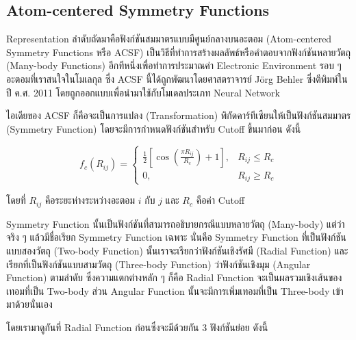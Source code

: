 \subsection{Atom-centered Symmetry Functions}
\label{ssec:acsf}

Representation ลำดับถัดมาคือฟังก์ชันสมมาตรแบบมีศูนย์กลางบนอะตอม (Atom-centered Symmetry Functions หรือ ACSF) เป็นวิธีที่ทำการสร้างผลลัพธ์หรือคำตอบจากฟังก์ชันหลายวัตถุ (Many-body Functions) อีกทีหนึ่งเพื่อทำการประมาณค่า Electronic Environment รอบ ๆ อะตอมที่เราสนใจในโมเลกุล ซึ่ง ACSF นี้ได้ถูกพัฒนาโดยศาสตราจารย์ J\"{o}rg Behler ซึ่งตีพิมพ์ในปี ค.ศ. 2011 โดยถูกออกแบบเพื่อนำมาใช้กับโมเดลประเภท Neural Network \autocite{behler2011a}

ไอเดียของ ACSF ก็คือจะเป็นการแปลง (Transformation) พิกัดคาร์ทีเซียนให้เป็นฟังก์ชันสมมาตร (Symmetry Function) โดยจะมีการกำหนดฟังก์ชันสำหรับ Cutoff ขึ้นมาก่อน ดังนี้

\begin{equation}\label{eq:acsf_cutoff}
    f_{c}(R_{ij}) =
    \begin{cases}
        \frac{1}{2} \left[\cos(\frac{\textstyle \pi R_{ij}}{\textstyle R_{c}}) + 1 \right], & R_{ij} \le R_{c} \\
        0,                                                                                  & R_{ij} \ge R_{c}
    \end{cases}
\end{equation}

\noindent โดยที่ $R_{ij}$ คือระยะห่างระหว่างอะตอม $i$ กับ $j$ และ $R_{c}$ คือค่า Cutoff

Symmetry Function นั้นเป็นฟังก์ชันที่สามารถอธิบายกรณีแบบหลายวัตถุ (Many-body) แต่ว่าจริง ๆ แล้วมีชื่อเรียก Symmetry Function เฉพาะ นั่นคือ Symmetry Function ที่เป็นฟังก์ชันแบบสองวัตถุ (Two-body Function) นั้นเราจะเรียกว่าฟังก์ชันเชิงรัศมี (Radial Function) และเรียกที่เป็นฟังก์ชันแบบสามวัตถุ (Three-body Function) ว่าฟังก์ชันเชิงมุม (Angular Function) ตามลำดับ ซึ่งความแตกต่างหลัก ๆ ก็คือ Radial Function จะเป็นผลรวมเชิงเส้นของเทอมที่เป็น Two-body ส่วน Angular Function นั้นจะมีการเพิ่มเทอมที่เป็น Three-body เข้ามาด้วยนั่นเอง

โดยเรามาดูกันที่ Radial Function ก่อนซึ่งจะมีด้วยกัน 3 ฟังก์ชันย่อย ดังนี้

